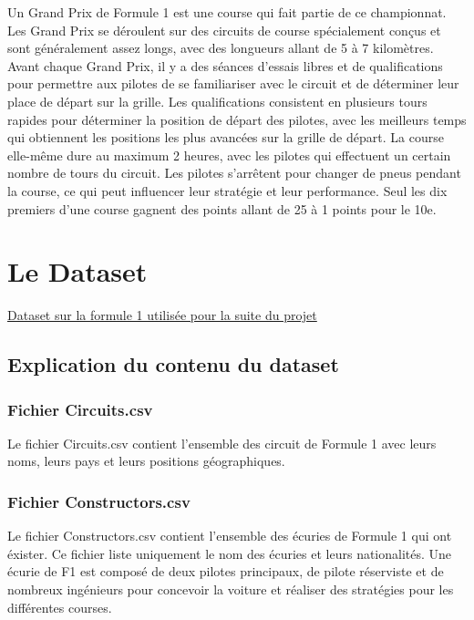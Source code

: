 Un Grand Prix de Formule 1 est une course qui fait partie de ce championnat. Les Grand Prix se déroulent sur des circuits de course spécialement conçus et sont généralement assez longs, avec des longueurs allant de 5 à 7 kilomètres. Avant chaque Grand Prix, il y a des séances d'essais libres et de qualifications pour permettre aux pilotes de se familiariser avec le circuit et de déterminer leur place de départ sur la grille. Les qualifications consistent en plusieurs tours rapides pour déterminer la position de départ des pilotes, avec les meilleurs temps qui obtiennent les positions les plus avancées sur la grille de départ. La course elle-même dure au maximum 2 heures, avec les pilotes qui effectuent un certain nombre de tours du circuit. Les pilotes s'arrêtent pour changer de pneus pendant la course, ce qui peut influencer leur stratégie et leur performance. Seul les dix premiers d'une course gagnent des points allant de 25 à 1 points pour le 10e.


\newpage
\section{Le Dataset}

\href{https://www.kaggle.com/datasets/thedevastator/formula-one-racing-a-comprehensive-data-analysis}{Dataset sur la formule 1 utilisée pour la suite du projet}\\

\subsection{Explication du contenu du dataset}

\subsubsection{Fichier Circuits.csv}
Le fichier Circuits.csv contient l'ensemble des circuit de Formule 1 avec leurs noms, leurs pays et leurs positions géographiques.

\subsubsection{Fichier Constructors.csv}
Le fichier Constructors.csv contient l'ensemble des écuries de Formule 1 qui ont éxister. Ce fichier liste uniquement le nom des écuries et leurs nationalités. Une écurie de F1 est composé de deux pilotes principaux, de pilote réserviste et de nombreux ingénieurs pour concevoir la voiture et réaliser des stratégies pour les différentes courses.

